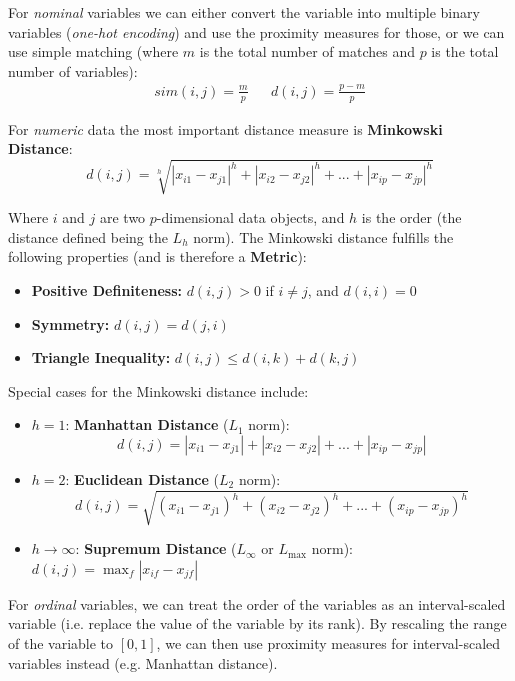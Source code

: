 \documentclass[12pt]{article}
\begin{document}
\newpage
\noindent
For \textit{nominal} variables we can either convert the variable into multiple binary variables (\textit{one-hot encoding}) and use the proximity measures for those, or we can use simple matching (where $m$ is the total number of matches and $p$ is the total number of variables):
\begin{align*}
    sim(i, j) = \frac{m}{p} && d(i, j) = \frac{p - m}{p}
\end{align*}

\noindent
For \textit{numeric} data the most important distance measure is \textbf{Minkowski Distance}:
\[ d(i, j) = \sqrt[h]{|x_{i1} - x_{j1}|^h + |x_{i2} - x_{j2}|^h + ... + |x_{ip} - x_{jp}|^h} \]

\noindent
Where $i$ and $j$ are two $p$-dimensional data objects, and $h$ is the order (the distance defined being the $L_h$ norm).
The Minkowski distance fulfills the following properties (and is therefore a \textbf{Metric}):

\begin{itemize}
    \item \textbf{Positive Definiteness:} $d(i, j) > 0$ if $i \neq j$, and $d(i, i) = 0$
    \item \textbf{Symmetry:} $d(i, j) = d(j, i)$
    \item \textbf{Triangle Inequality:} $d(i, j) \leq d(i, k) + d(k, j)$
\end{itemize}

\noindent
Special cases for the Minkowski distance include:

\begin{itemize}
    \item $h = 1$: \textbf{Manhattan Distance} ($L_1$ norm):
    \[ d(i, j) = |x_{i1} - x_{j1}| + |x_{i2} - x_{j2}| + ... + |x_{ip} - x_{jp}| \]
    \item $h = 2$: \textbf{Euclidean Distance} ($L_2$ norm):
    \[ d(i, j) = \sqrt{(x_{i1} - x_{j1})^h + (x_{i2} - x_{j2})^h + ... + (x_{ip} - x_{jp})^h} \]
    \item $h \rightarrow \infty$: \textbf{Supremum Distance} ($L_\infty$ or $L_{\max}$ norm): \ $d(i, j) = \max_f |x_{if} - x_{jf}|$
\end{itemize}

\noindent
For \textit{ordinal} variables, we can treat the order of the variables as an interval-scaled variable (i.e. replace the value of the variable by its rank).
By rescaling the range of the variable to $[0, 1]$, we can then use proximity measures for interval-scaled variables instead (e.g. Manhattan distance).
\end{document}
